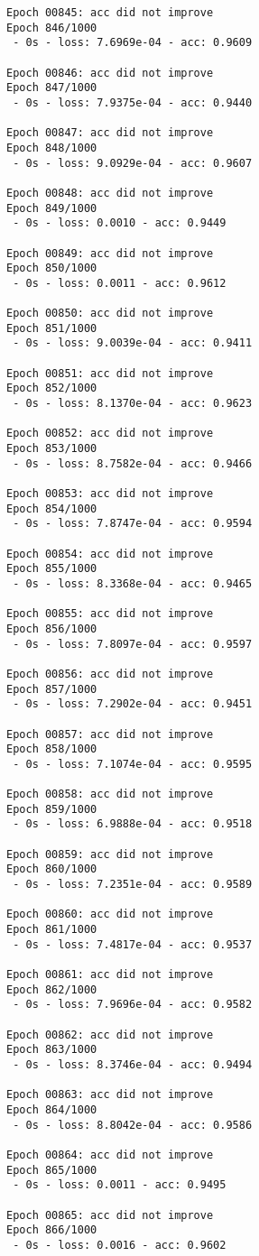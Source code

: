 \documentclass[11pt]{article}
\begin{document}
\begin{Verbatim}[commandchars=\\\{\}]
Epoch 00845: acc did not improve
Epoch 846/1000
 - 0s - loss: 7.6969e-04 - acc: 0.9609

Epoch 00846: acc did not improve
Epoch 847/1000
 - 0s - loss: 7.9375e-04 - acc: 0.9440

Epoch 00847: acc did not improve
Epoch 848/1000
 - 0s - loss: 9.0929e-04 - acc: 0.9607

Epoch 00848: acc did not improve
Epoch 849/1000
 - 0s - loss: 0.0010 - acc: 0.9449

Epoch 00849: acc did not improve
Epoch 850/1000
 - 0s - loss: 0.0011 - acc: 0.9612

Epoch 00850: acc did not improve
Epoch 851/1000
 - 0s - loss: 9.0039e-04 - acc: 0.9411

Epoch 00851: acc did not improve
Epoch 852/1000
 - 0s - loss: 8.1370e-04 - acc: 0.9623

Epoch 00852: acc did not improve
Epoch 853/1000
 - 0s - loss: 8.7582e-04 - acc: 0.9466

Epoch 00853: acc did not improve
Epoch 854/1000
 - 0s - loss: 7.8747e-04 - acc: 0.9594

Epoch 00854: acc did not improve
Epoch 855/1000
 - 0s - loss: 8.3368e-04 - acc: 0.9465

Epoch 00855: acc did not improve
Epoch 856/1000
 - 0s - loss: 7.8097e-04 - acc: 0.9597

Epoch 00856: acc did not improve
Epoch 857/1000
 - 0s - loss: 7.2902e-04 - acc: 0.9451

Epoch 00857: acc did not improve
Epoch 858/1000
 - 0s - loss: 7.1074e-04 - acc: 0.9595

Epoch 00858: acc did not improve
Epoch 859/1000
 - 0s - loss: 6.9888e-04 - acc: 0.9518

Epoch 00859: acc did not improve
Epoch 860/1000
 - 0s - loss: 7.2351e-04 - acc: 0.9589

Epoch 00860: acc did not improve
Epoch 861/1000
 - 0s - loss: 7.4817e-04 - acc: 0.9537

Epoch 00861: acc did not improve
Epoch 862/1000
 - 0s - loss: 7.9696e-04 - acc: 0.9582

Epoch 00862: acc did not improve
Epoch 863/1000
 - 0s - loss: 8.3746e-04 - acc: 0.9494

Epoch 00863: acc did not improve
Epoch 864/1000
 - 0s - loss: 8.8042e-04 - acc: 0.9586

Epoch 00864: acc did not improve
Epoch 865/1000
 - 0s - loss: 0.0011 - acc: 0.9495

Epoch 00865: acc did not improve
Epoch 866/1000
 - 0s - loss: 0.0016 - acc: 0.9602


\end{Verbatim}
\end{document}
